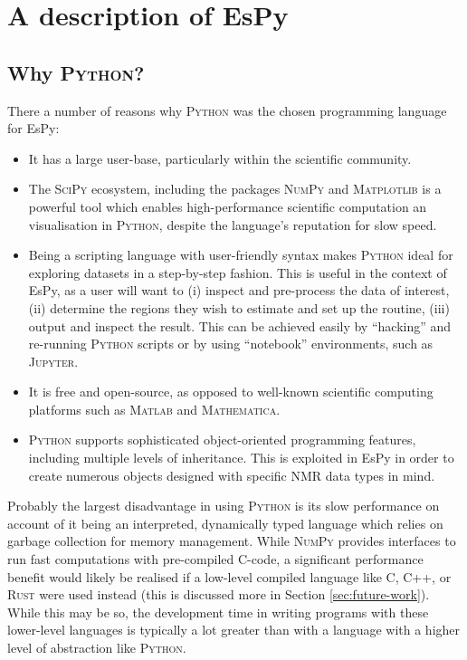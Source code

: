 \section{A description of \acs{EsPy}}

\subsection{Why \textsc{Python}?}
There a number of reasons why \textsc{Python} was the chosen programming
language for \ac{EsPy}:
\begin{itemize}
    \item It has a large user-base, particularly within the scientific
        community.
    \item The \textsc{SciPy} ecosystem\cite{Virtanen2020}, including the packages
        \textsc{NumPy}\cite{Harris2020} and
        \textsc{Matplotlib}\cite{Hunter2007} is a powerful tool which enables
        high-performance scientific computation an visualisation in
        \textsc{Python}, despite the language's reputation for slow speed.
    \item Being a scripting language with user-friendly syntax makes
        \textsc{Python} ideal for exploring datasets in a step-by-step fashion.
        This is useful in the context of \ac{EsPy}, as a user will want to
        (i) inspect and pre-process the data of interest,
        (ii) determine the regions they wish to estimate and set up the
        routine,
        (iii) output and inspect the result.
        This can be achieved easily by ``hacking'' and re-running
        \textsc{Python} scripts or by using ``notebook'' environments, such as
        \textsc{Jupyter}.
    \item It is free and open-source, as opposed to well-known scientific
        computing platforms such as \textsc{Matlab} and \textsc{Mathematica}.
    \item \textsc{Python} supports sophisticated object-oriented programming
        features, including multiple levels of inheritance. This is exploited in
        \ac{EsPy} in order to create numerous objects designed with specific
        \ac{NMR} data types in mind.
\end{itemize}

Probably the largest disadvantage in using \textsc{Python} is its slow performance on
account of it being an interpreted, dynamically typed language which relies on
garbage collection for memory management. While \textsc{NumPy} provides
interfaces to run fast computations with pre-compiled C-code, a significant
performance benefit would likely be realised if a low-level compiled language
like C, C++, or \textsc{Rust} were used instead (this is discussed more in
Section \ref{sec:future-work}). While this may be so, the
development time in writing programs with these lower-level languages is
typically a lot greater than with a language with a higher level of abstraction
like \textsc{Python}.

